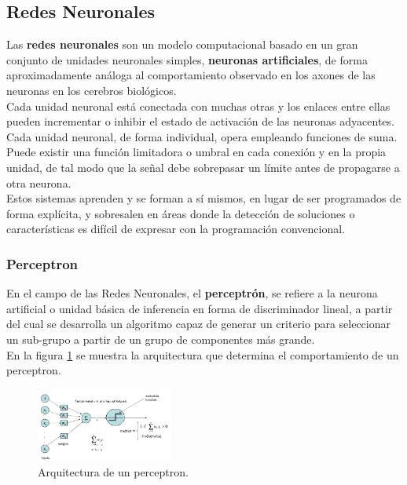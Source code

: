 \documentclass[osajnl,twocolumn,showpacs,superscriptaddress,10pt]{revtex4-1} %
\begin{document}
\subsection{Redes Neuronales}

Las \textbf{redes neuronales} son un modelo computacional basado en un gran conjunto de unidades neuronales simples, \textbf{neuronas artificiales}, de forma aproximadamente análoga al comportamiento observado en los axones de las neuronas en los cerebros biológicos. \\

Cada unidad neuronal está conectada con muchas otras y los enlaces entre ellas pueden incrementar o inhibir el estado de activación de las neuronas adyacentes. Cada unidad neuronal, de forma individual, opera empleando funciones de suma. Puede existir una función limitadora o umbral en cada conexión y en la propia unidad, de tal modo que la señal debe sobrepasar un límite antes de propagarse a otra neurona. \\

Estos sistemas aprenden y se forman a sí mismos, en lugar de ser programados de forma explícita, y sobresalen en áreas donde la detección de soluciones o características es difícil de expresar con la programación convencional.

\subsubsection{Perceptron}

En el campo de las Redes Neuronales, el \textbf{perceptrón}, se refiere a la neurona artificial o unidad básica de inferencia en forma de discriminador lineal, a partir del cual se desarrolla un algoritmo capaz de generar un criterio para seleccionar un sub-grupo a partir de un grupo de componentes más grande. \\

En la figura \ref{figure:perceptron_example} se muestra la arquitectura que determina el comportamiento de un perceptron.

\begin{figure}[H]
    \centering
    \includegraphics[width=0.4\textwidth]{theory/perceptron}
    \caption{Arquitectura de un perceptron.}
    \label{figure:perceptron_example}
\end{figure}
\end{document}
